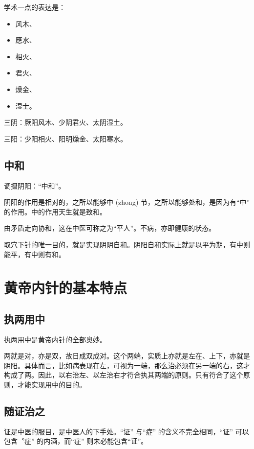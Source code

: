 \documentclass[
]{book}
\providecommand{\tightlist}{%
  \setlength{\itemsep}{0pt}\setlength{\parskip}{0pt}}
\begin{document}
学术一点的表达是：

\begin{itemize}
\tightlist
\item
  风木、
\item
  應水、
\item
  相火、
\item
  君火、
\item
  燥金、
\item
  湿士。
\end{itemize}

三阴：厥阳风木、少阴君火、太阴湿土。

三阳：少阳相火、阳明燥金、太阳寒水。

\section{中和}\label{ux4e2dux548c}

调摄阴阳：``中和''。

阴阳的作用是相对的，之所以能够中 (zhong) 节，之所以能够处和，是因为有``中'' 的作用。中的作用天生就是致和。

由矛盾走向协和，这在中医可称之为``平人''。不病，亦即健康的状态。

取穴下针的唯一目的，就是实现阴阴自和。阴阳自和实际上就是以平为期，有中则能平，有中则有和。

\chapter{黄帝内针的基本特点}\label{ux9ec4ux5e1dux5185ux9488ux7684ux57faux672cux7279ux70b9}

\section{执两用中}\label{ux6267ux4e24ux7528ux4e2d}

执两用中是黄帝内针的全部奥妙。

两就是对，亦是双，故日成双成对。这个两端，实质上亦就是左在、上下，亦就是阴阳。具体而言，比如病表现在左，可视为一端，那么治必须在另一端的右，这才构成了两。因此，以右治左、以左治右才符合执其两端的原则。只有符合了这个原则，才能实现用中的目的。

\section{随证治之}\label{ux968fux8bc1ux6cbbux4e4b}

证是中医的服目，是中医人的下手处。``证'' 与``症'' 的含义不完全相同，``证'' 可以包含〝症'' 的内酒，而``症'' 则未必能包含``证''。
\end{document}
